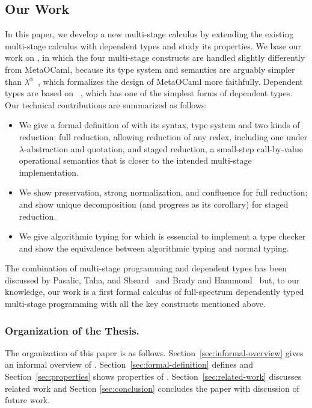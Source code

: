 \subsection{Our Work}
In this paper, we develop a new multi-stage calculus \LMD by extending
the existing multi-stage calculus \LTP\cite{Hanada2014} with dependent
types and study its properties.  We base our work on \LTP, in which
the four multi-stage constructs are handled slightly differently from
MetaOCaml, because its type system and semantics are arguably simpler
than \(\lambda^\alpha\)~\cite{taha2003environment}, which formalizes
the design of MetaOCaml more faithfully.  Dependent types are based on
\LLF~\cite{attapl}, which has one of the simplest forms of dependent
types.  Our technical contributions are summarized as follows:
\begin{itemize}
    \item We give a formal definition of \LMD with its syntax, type system and
        two kinds of reduction: full reduction, allowing reduction of any redex,
        including one under $\lambda$-abstraction and quotation, and staged reduction, a
        small-step call-by-value operational semantics that is closer to the intended
        multi-stage implementation.
    \item We show preservation, strong normalization, and confluence for
        full reduction; and show unique decomposition (and progress as its
        corollary) for staged reduction.
    \item We give algorithmic typing for \LMD which is essencial to implement a
        type checker and show the equivalence between algorithmic typing and
        normal typing.
\end{itemize}
The combination of multi-stage programming and dependent types has been
discussed by Pasalic, Taha, and Sheard~\cite{pasalic2002tagless} and Brady and
Hammond~\cite{brady2006dependently} but, to our knowledge, our work is a first
formal calculus of full-spectrum dependently typed multi-stage programming with
all the key constructs mentioned above.

\subsubsection{Organization of the Thesis.}

The organization of this paper is as follows.
Section~\ref{sec:informal-overview} gives an informal overview of
\LMD. Section~\ref{sec:formal-definition} defines \LMD and
Section~\ref{sec:properties} shows properties of \LMD.
Section~\ref{sec:related-work} discusses related work and Section
\ref{sec:conclusion} concludes the paper with discussion of future
work.
